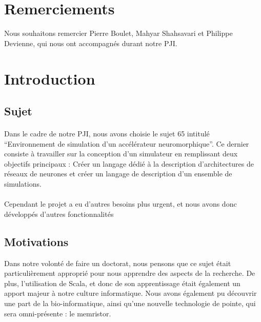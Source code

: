 \documentclass[a4paper,10pt]{article}
\begin{document}
\section*{Remerciements}

Nous souhaitons remercier Pierre Boulet, Mahyar Shahsavari et Philippe Devienne, qui nous ont accompagnés durant notre PJI.

\newpage


\tableofcontents

\newpage


\section*{Introduction}

\subsection*{Sujet} 

\paragraph{}
Dans le cadre de notre PJI, nous avons choisie le sujet 65 intitulé \enquote{Environnement de simulation d'un accélérateur neuromorphique}. Ce dernier consiste à travailler sur la conception d'un simulateur en remplissant deux objectifs principaux : Créer un langage dédié à la description d'architectures de réseaux de neurones
et créer un langage de description d'un ensemble de simulations.

\paragraph{}
Cependant le projet a eu d’autres besoins plus urgent, et nous avons donc développés d'autres fonctionnalités

\subsection*{Motivations}
Dans notre volonté de faire un doctorat, nous pensons que ce sujet était particulièrement approprié pour nous apprendre des aspects de la recherche. De plus, l’utilisation de Scala, et donc de son apprentissage était également un apport majeur à notre culture informatique. Nous avons également pu découvrir une part de la bio-informatique, ainsi qu'une nouvelle technologie de pointe, qui sera omni-présente : le memristor.
\end{document}
